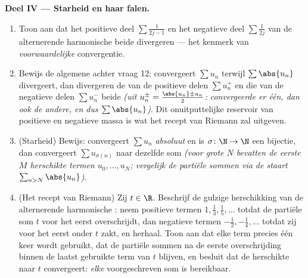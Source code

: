 \begin{problem}[{Weekendopgave --- $H_n = \ln n + \gamma +
\frac{1}{2n} + O(n^{-2})$, en het herschikken van $1 - \frac12 +
\frac13 - \dots$ tot $\frac{\ln 2}{2}$}]
\medskip
\noindent\textbf{Deel IV --- Starheid en haar falen.}
\begin{enumerate}[resume]
  \item Toon aan dat het positieve deel $\sum \frac{1}{2j-1}$ en
        het negatieve deel $\sum \frac{1}{2j}$ van de alternerende
        harmonische  beide divergeren --- het kenmerk van
        \emph{voorwaardelijke} convergentie.
  \item Bewijs de algemene  achter vraag 12: convergeert
        $\sum u_n$ terwijl $\sum \abs{u_n}$ divergeert, dan
        divergeren de  van de positieve delen $\sum u_n^+$ en
        die van de negatieve delen $\sum u_n^-$ beide \emph{(uit
        $u_n^\pm = \frac{\abs{u_n} \pm u_n}{2}$: convergeerde er
        één, dan ook de andere, en dus $\sum\abs{u_n}$)}. Dit
        onuitputtelijke reservoir van positieve en negatieve massa
        is wat het recept van Riemann zal uitgeven.
  \item (Starheid) Bewijs: convergeert $\sum u_n$ \emph{absoluut}
        en is $\sigma \colon \N \to \N$ een bijectie, dan
        convergeert $\sum u_{\sigma(n)}$ naar dezelfde som
        \emph{(voor grote $N$ bevatten de eerste $M$ herschikte
        termen $u_0, \dots, u_N$; vergelijk de partiële sommen via
        de staart $\sum_{n > N}\abs{u_n}$)}.
  \item (Het recept van Riemann) Zij $t \in \R$. Beschrijf de
        gulzige herschikking van de alternerende harmonische
        : neem positieve termen $1, \frac13, \frac15, \dots$
        totdat de partiële som $t$ voor het eerst overschrijdt, dan
        negatieve termen $-\frac12, -\frac14, \dots$ totdat zij
        voor het eerst onder $t$ zakt, en herhaal. Toon aan dat
        elke term precies één keer wordt gebruikt, dat de partiële
        sommen na de eerste overschrijding binnen de laatst
        gebruikte term van $t$ blijven, en besluit dat de
        herschikte  naar $t$ convergeert: \emph{elke}
        voorgeschreven som is bereikbaar.
\end{enumerate}


\end{problem}
